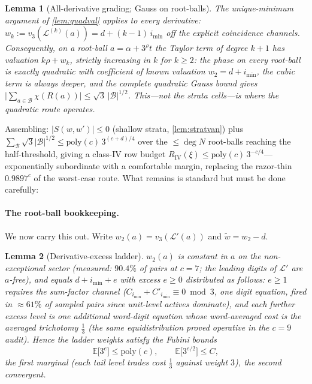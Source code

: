\documentclass[11pt]{article}
\newcommand{\E}{\mathbb{E}}
\theoremstyle{plain}
\newtheorem{lemma}{Lemma}
\theoremstyle{definition}
\theoremstyle{remark}
\begin{document}
\begin{lemma}[All-derivative grading; Gauss on root-balls]
\label{lem:rootball}
The unique-minimum argument of \cref{lem:quadval} applies to every
derivative: $w_k:=v_3(\mathcal L^{(k)}(a))=d+(k-1)\,i_{\min}$ off the
explicit coincidence channels. Consequently, on a root-ball
$a=\alpha+3^{\rho}t$ the Taylor term of degree $k+1$ has valuation
$k\rho+w_k$, strictly increasing in $k$ for $k\ge2$: the phase on every
root-ball is \emph{exactly quadratic} with coefficient of known valuation
$w_2=d+i_{\min}$, the cubic term is always deeper, and the complete
quadratic Gauss bound gives
$\bigl|\sum_{a\in\mathcal B}\chi(R(a))\bigr|
\le\sqrt3\,|\mathcal B|^{1/2}$. This---not the strata cells---is where
the quadratic route operates.
\end{lemma}

Assembling: $|S(w,w')|\le0$ (shallow strata, \cref{lem:stratvan}) plus
$\sum_{\mathcal B}\sqrt3|\mathcal B|^{1/2}
\le\mathrm{poly}(c)\,3^{(c+d)/4}$ over the $\le\deg N$ root-balls
reaching the half-threshold, giving a class-IV row budget
$R_{\mathrm{IV}}(\xi)\le\mathrm{poly}(c)\,3^{-c/4}$---exponentially
subordinate with a comfortable margin, replacing the razor-thin
$0.9897^c$ of the worst-case route. What remains is standard but must be
done carefully:

\paragraph{The root-ball bookkeeping.} We now carry this out. Write
$w_2(a)=v_3(\mathcal L'(a))$ and $\tilde w=w_2-d$.

\begin{lemma}[Derivative-excess ladder]\label{lem:ladder}
$w_2(a)$ is constant in $a$ on the non-exceptional sector (measured:
$90.4\%$ of pairs at $c=7$; the leading digits of $\mathcal L'$ are
$a$-free), and equals $d+i_{\min}+e$ with excess $e\ge0$ distributed as
follows: $e\ge1$ requires the sum-factor channel
($C_{i_{\min}}+C'_{i_{\min}}\equiv0\bmod3$, one digit equation, fired
in $\approx61\%$ of sampled pairs since unit-level actives dominate),
and each further excess level is one additional word-digit equation whose
\emph{word-averaged} cost is the averaged trichotomy $\tfrac13$
(the same equidistribution proved operative in the $c=9$ audit). Hence the
ladder weights satisfy the Fubini bounds
\[
\E\bigl[3^{e}\bigr]\le\mathrm{poly}(c),
\qquad
\E\bigl[3^{e/2}\bigr]\le C,
\]
the first marginal (each tail level trades cost $\tfrac13$ against weight
$3$), the second convergent.
\end{lemma}
\end{document}
